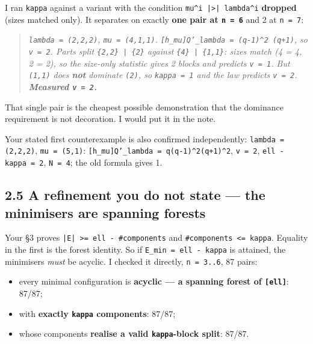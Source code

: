 \documentclass[11pt,a4paper]{article}
\begin{document}
I ran \mbox{\texttt{kappa}} against a variant with the condition \mbox{\texttt{mu\textasciicircum{}i |>| lambda\textasciicircum{}i}} \textbf{dropped} (sizes matched only). It separates on exactly \textbf{one pair at \mbox{\texttt{n = 6}}} and 2 at \mbox{\texttt{n = 7}}:

\begin{quote}\itshape \mbox{\texttt{lambda = (2,2,2)}}, \mbox{\texttt{mu = (4,1,1)}}. \mbox{\texttt{[h\_mu]Q'\_lambda = (q-1)\textasciicircum{}2 (q+1)}}, so \mbox{\texttt{v = 2}}. Parts split \mbox{\texttt{\{2,2\} | \{2\}}} against \mbox{\texttt{\{4\} | \{1,1\}}}: sizes match (4 = 4, 2 = 2), so the size-only statistic gives 2 blocks and predicts \mbox{\texttt{v = 1}}. But \mbox{\texttt{(1,1)}} does \textbf{not} dominate \mbox{\texttt{(2)}}, so \mbox{\texttt{kappa = 1}} and the law predicts \mbox{\texttt{v = 2}}. \textbf{Measured \mbox{\texttt{v = 2}}.}\end{quote}

That single pair is the cheapest possible demonstration that the dominance requirement is not decoration. I would put it in the note.

Your stated first counterexample is also confirmed independently: \mbox{\texttt{lambda = (2,2,2)}}, \mbox{\texttt{mu = (5,1)}}: \mbox{\texttt{[h\_mu]Q'\_lambda = q(q-1)\textasciicircum{}2(q+1)\textasciicircum{}2}}, \mbox{\texttt{v = 2}}, \mbox{\texttt{ell - kappa = 2}}, \mbox{\texttt{N = 4}}; the old formula gives 1.

\subsection*{2.5 A refinement you do not state --- the minimisers are \textbf{spanning forests}}

Your §3 proves \mbox{\texttt{|E| >= ell - \#components}} and \mbox{\texttt{\#components <= kappa}}. Equality in the first is the forest identity. So if \mbox{\texttt{E\_min = ell - kappa}} is attained, the minimisers \emph{must} be acyclic. I checked it directly, \mbox{\texttt{n = 3..6}}, 87 pairs:

\begin{itemize}
\item every minimal configuration is \textbf{acyclic --- a spanning forest of \mbox{\texttt{[ell]}}}: 87/87;
\item with \textbf{exactly \mbox{\texttt{kappa}} components}: 87/87;
\item whose components \textbf{realise a valid \mbox{\texttt{kappa}}-block split}: 87/87.
\end{itemize}
\end{document}
